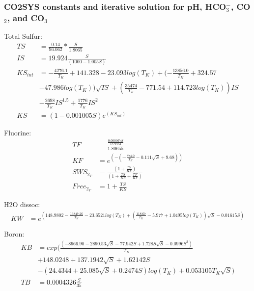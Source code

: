 \documentclass{ruthesis}
\begin{document}


\subsubsection{CO2SYS constants and iterative solution for pH, HCO$_3^-$, CO$_2$, and CO$_3$}

Total Sulfur:
\begin{align*}
TS     	&= \frac{0.14}{96.062} * \frac{S}{1.8065} \nonumber \\
IS     	&= 19.924 \frac{S}{(1000 - 1.005 S)} \nonumber \\
KS_{int} 	&= -\frac{4276.1}{T_K} + 141.328 - 23.093 log(T_K) + (-\frac{13856.0}{T_K} + 324.57 \nonumber\\ 			 
& - 47.986 log(T_K)) \sqrt{IS} + ( \frac{35474}{T_K} - 771.54  + 114.723 log(T_K)) IS \nonumber \\
& - \frac{2698}{T_K} IS^{1.5} + \frac{1776}{T_K} IS^2 \nonumber \\
KS     	&=  (1 - 0.001005 S)e^{(KS_{int})} \nonumber 
\end{align*}

Fluorine:
\begin{align*}
TF       	&= \frac{\frac{0.000067 S}{18.9984}}{1.80655} \nonumber \\
KF       	&= e^{(-(-\frac{874.0}{T_K} - 0.111 \sqrt{S} + 9.68))} \nonumber \\
SWS_{2_T}  	&= \frac{(1 + \frac{TS}{KS})}{(1 + \frac{TS}{KS} + \frac{TF}{KF})} \nonumber \\
Free_{2_T} 	&= 1 + \frac{TS}{KS} \nonumber 
\end{align*}

H2O dissoc:
\begin{align*}
KW 		&= e^{(148.9802 - \frac{13847.26}{T_K}  - 23.6521 log(T_K) 
+ (\frac{118.67}{T_K} - 5.977 + 1.0495 log(T_K)) \sqrt{S} - 0.01615 S)} \nonumber 
\end{align*}

Boron:
\begin{align*}
KB 		&= exp(\frac{(-8966.90 - 2890.53 \sqrt{S} - 77.942 S + 1.728 S \sqrt{S} - 0.0996 S^2)}{T_K} \\
&+ 148.0248 + 137.1942 \sqrt{S} + 1.62142 S \\
&- (24.4344 + 25.085 \sqrt{S} + 0.2474 S) log(T_K) + 0.053105 T_K \sqrt{S}) \nonumber \\
TB 		&= 0.0004326 \frac{S}{35} \nonumber 
\end{align*}
\end{document}
